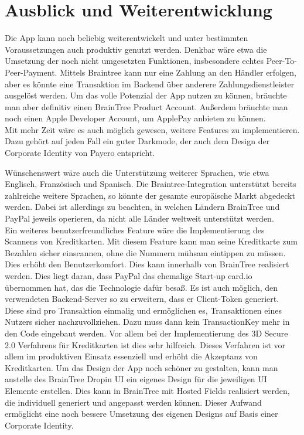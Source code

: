 
\chapter{Ausblick und Weiterentwicklung}

Die App kann noch beliebig weiterentwickelt und unter bestimmten Voraussetzungen auch produktiv genutzt werden.
Denkbar wäre etwa die Umsetzung der noch nicht umgesetzten Funktionen, insbesondere echtes Peer-To-Peer-Payment.
Mittels Braintree kann nur eine Zahlung an den Händler erfolgen, aber es könnte eine Transaktion im Backend über anderere Zahlungsdienstleister ausgelöst werden.
Um das volle Potenzial der App nutzen zu können, bräuchte man aber definitiv einen BrainTree Product Account.
Außerdem bräuchte man noch einen Apple Developer Account, um ApplePay anbieten zu können.\\
Mit mehr Zeit wäre es auch möglich gewesen, weitere Features zu implementieren.
Dazu gehört auf jeden Fall ein guter Darkmode, der auch dem Design der Corporate Identity von \glqq Payero\grqq{} entspricht.

Wünschenswert wäre auch die Unterstützung weiterer Sprachen, wie etwa Englisch, Französisch und Spanisch.
Die Braintree-Integration unterstützt bereits zahlreiche weitere Sprachen, so könnte der gesamte europäische Markt abgedeckt werden. Dabei ist allerdings zu beachten, in welchen Ländern BrainTree und PayPal jeweils operieren, da nicht alle Länder weltweit unterstützt werden.
\\
Ein weiteres benutzerfreundliches Feature wäre die Implementierung des Scannens von Kreditkarten.
Mit diesem Feature kann man seine Kreditkarte zum Bezahlen sicher einscannen, ohne die Nummern mühsam eintippen zu müssen.
Dies erhöht den Benutzerkomfort.
Dies kann innerhalb von BrainTree realisiert werden.
Dies liegt daran, dass PayPal das ehemalige Start-up card.io übernommen hat, das die Technologie dafür besaß.
Es ist auch möglich, den verwendeten Backend-Server so zu erweitern, dass er Client-Token generiert.
Diese sind pro Transaktion einmalig und ermöglichen es, Transaktionen eines Nutzers sicher nachzuvollziehen.
Dazu muss dann kein TransactionKey mehr in den Code eingebaut werden.
Vor allem bei der Implementierung des 3D Secure 2.0 Verfahrens für Kreditkarten ist dies sehr hilfreich.
Dieses Verfahren ist vor allem im produktiven Einsatz essenziell und erhöht die Akzeptanz von Kreditkarten.
Um das Design der App noch schöner zu gestalten, kann man anstelle des BrainTree Dropin UI ein eigenes Design für die jeweiligen UI Elemente erstellen.
Dies kann in BrainTree mit Hosted Fields realisiert werden, die individuell generiert und angepasst werden können.
Dieser Aufwand ermöglicht eine noch bessere Umsetzung des eigenen Designs auf Basis einer Corporate Identity.
